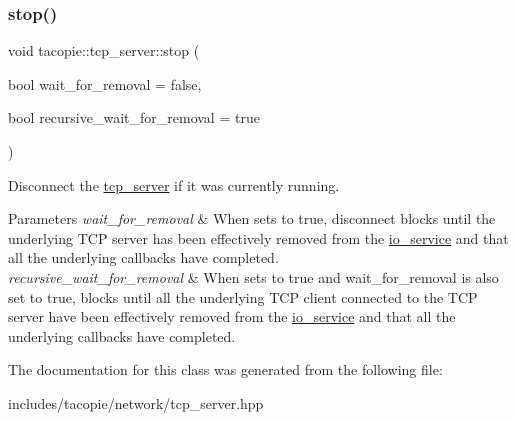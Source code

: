 \subsubsection{\texorpdfstring{stop()}{stop()}}
{\footnotesize\ttfamily void tacopie\+::tcp\+\_\+server\+::stop (\begin{DoxyParamCaption}\item[{bool}]{wait\+\_\+for\+\_\+removal = {\ttfamily false},  }\item[{bool}]{recursive\+\_\+wait\+\_\+for\+\_\+removal = {\ttfamily true} }\end{DoxyParamCaption})}

Disconnect the \hyperlink{classtacopie_1_1tcp__server}{tcp\+\_\+server} if it was currently running.


\begin{DoxyParams}{Parameters}
{\em wait\+\_\+for\+\_\+removal} & When sets to true, disconnect blocks until the underlying T\+CP server has been effectively removed from the \hyperlink{classtacopie_1_1io__service}{io\+\_\+service} and that all the underlying callbacks have completed. \\
\hline
{\em recursive\+\_\+wait\+\_\+for\+\_\+removal} & When sets to true and wait\+\_\+for\+\_\+removal is also set to true, blocks until all the underlying T\+CP client connected to the T\+CP server have been effectively removed from the \hyperlink{classtacopie_1_1io__service}{io\+\_\+service} and that all the underlying callbacks have completed. \\
\hline
\end{DoxyParams}


The documentation for this class was generated from the following file\+:\begin{DoxyCompactItemize}
\item 
includes/tacopie/network/tcp\+\_\+server.\+hpp\end{DoxyCompactItemize}
